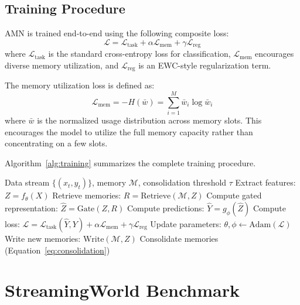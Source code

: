 \documentclass[11pt]{article}
\begin{document}
\subsection{Training Procedure}

AMN is trained end-to-end using the following composite loss:
\begin{equation}
    \mathcal{L} = \mathcal{L}_{\text{task}} + \alpha \mathcal{L}_{\text{mem}} + \gamma \mathcal{L}_{\text{reg}}
\end{equation}
where $\mathcal{L}_{\text{task}}$ is the standard cross-entropy loss for classification, $\mathcal{L}_{\text{mem}}$ encourages diverse memory utilization, and $\mathcal{L}_{\text{reg}}$ is an EWC-style regularization term.

The memory utilization loss is defined as:
\begin{equation}
    \mathcal{L}_{\text{mem}} = -H(\bar{w}) = \sum_{i=1}^{M} \bar{w}_i \log \bar{w}_i
\end{equation}
where $\bar{w}$ is the normalized usage distribution across memory slots. This encourages the model to utilize the full memory capacity rather than concentrating on a few slots.

Algorithm~\ref{alg:training} summarizes the complete training procedure.

\begin{algorithm}
\caption{AMN Training Procedure}
\label{alg:training}
\begin{algorithmic}[1]
\REQUIRE Data stream $\{(x_t, y_t)\}$, memory $\mathcal{M}$, consolidation threshold $\tau$
    \STATE Extract features: $Z = f_\theta(X)$
    \STATE Retrieve memories: $R = \text{Retrieve}(\mathcal{M}, Z)$
    \STATE Compute gated representation: $\hat{Z} = \text{Gate}(Z, R)$
    \STATE Compute predictions: $\hat{Y} = g_\phi(\hat{Z})$
    \STATE Compute loss: $\mathcal{L} = \mathcal{L}_{\text{task}}(\hat{Y}, Y) + \alpha \mathcal{L}_{\text{mem}} + \gamma \mathcal{L}_{\text{reg}}$
    \STATE Update parameters: $\theta, \phi \leftarrow \text{Adam}(\mathcal{L})$
    \STATE Write new memories: $\text{Write}(\mathcal{M}, Z)$
        \STATE Consolidate memories (Equation~\ref{eq:consolidation})
    \ENDIF
\ENDFOR
\end{algorithmic}
\end{algorithm}

\section{StreamingWorld Benchmark}
\label{sec:benchmark}
\end{document}
